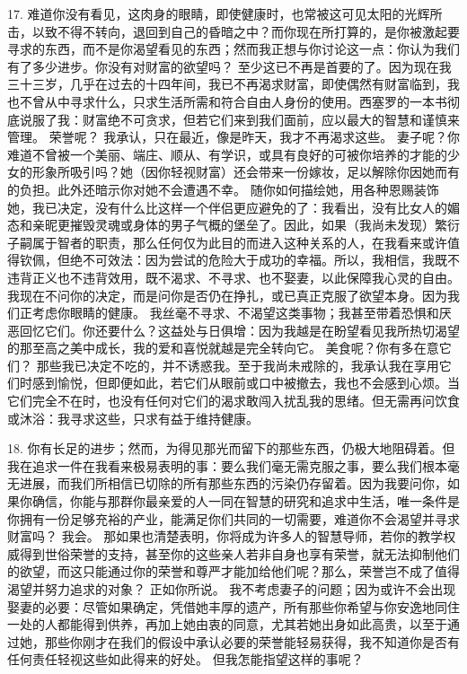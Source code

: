 17.  难道你没有看见，这肉身的眼睛，即使健康时，也常被这可见太阳的光辉所击，以致不得不转向，退回到自己的昏暗之中？而你现在所打算的，是你被激起要寻求的东西，而不是你渴望看见的东西；然而我正想与你讨论这一点：你认为我们有了多少进步。你没有对财富的欲望吗？ 至少这已不再是首要的了。因为现在我三十三岁，几乎在过去的十四年间，我已不再渴求财富，即使偶然有财富临到，我也不曾从中寻求什么，只求生活所需和符合自由人身份的使用。西塞罗的一本书彻底说服了我：财富绝不可贪求，但若它们来到我们面前，应以最大的智慧和谨慎来管理。 荣誉呢？ 我承认，只在最近，像是昨天，我才不再渴求这些。 妻子呢？你难道不曾被一个美丽、端庄、顺从、有学识，或具有良好的可被你培养的才能的少女的形象所吸引吗？她（因你轻视财富）还会带来一份嫁妆，足以解除你因她而有的负担。此外还暗示你对她不会遭遇不幸。 随你如何描绘她，用各种恩赐装饰她，我已决定，没有什么比这样一个伴侣更应避免的了：我看出，没有比女人的媚态和亲昵更摧毁灵魂或身体的男子气概的堡垒了。因此，如果（我尚未发现）繁衍子嗣属于智者的职责，那么任何仅为此目的而进入这种关系的人，在我看来或许值得钦佩，但绝不可效法：因为尝试的危险大于成功的幸福。所以，我相信，我既不违背正义也不违背效用，既不渴求、不寻求、也不娶妻，以此保障我心灵的自由。 我现在不问你的决定，而是问你是否仍在挣扎，或已真正克服了欲望本身。因为我们正考虑你眼睛的健康。 我丝毫不寻求、不渴望这类事物；我甚至带着恐惧和厌恶回忆它们。你还要什么？这益处与日俱增：因为我越是在盼望看见我所热切渴望的那至高之美中成长，我的爱和喜悦就越是完全转向它。 美食呢？你有多在意它们？ 那些我已决定不吃的，并不诱惑我。至于我尚未戒除的，我承认我在享用它们时感到愉悦，但即便如此，若它们从眼前或口中被撤去，我也不会感到心烦。当它们完全不在时，也没有任何对它们的渴求敢闯入扰乱我的思绪。但无需再问饮食或沐浴：我寻求这些，只求有益于维持健康。\par

18.  你有长足的进步；然而，为得见那光而留下的那些东西，仍极大地阻碍着。但我在追求一件在我看来极易表明的事：要么我们毫无需克服之事，要么我们根本毫无进展，而我们所相信已切除的所有那些东西的污染仍存留着。因为我要问你，如果你确信，你能与那群你最亲爱的人一同在智慧的研究和追求中生活，唯一条件是你拥有一份足够充裕的产业，能满足你们共同的一切需要，难道你不会渴望并寻求财富吗？ 我会。 那如果也清楚表明，你将成为许多人的智慧导师，若你的教学权威得到世俗荣誉的支持，甚至你的这些亲人若非自身也享有荣誉，就无法抑制他们的欲望，而这只能通过你的荣誉和尊严才能加给他们呢？那么，荣誉岂不成了值得渴望并努力追求的对象？ 正如你所说。 我不考虑妻子的问题；因为或许不会出现娶妻的必要：尽管如果确定，凭借她丰厚的遗产，所有那些你希望与你安逸地同住一处的人都能得到供养，再加上她由衷的同意，尤其若她出身如此高贵，以至于通过她，那些你刚才在我们的假设中承认必要的荣誉能轻易获得，我不知道你是否有任何责任轻视这些如此得来的好处。 但我怎能指望这样的事呢？\par

